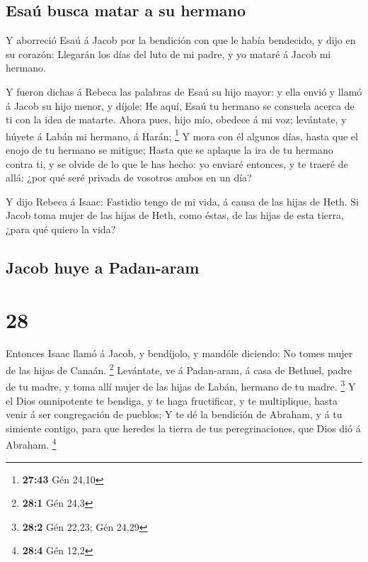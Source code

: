 \hypertarget{esauxfa-busca-matar-a-su-hermano}{%
\subsection{Esaú busca matar a su
hermano}\label{esauxfa-busca-matar-a-su-hermano}}

 Y aborreció Esaú á Jacob por la bendición con que le
había bendecido, y dijo en su corazón: Llegarán los días del luto de mi
padre, y yo mataré á Jacob mi hermano.

 Y fueron dichas á Rebeca las palabras de Esaú su hijo
mayor: y ella envió y llamó á Jacob su hijo menor, y díjole: He aquí,
Esaú tu hermano se consuela acerca de ti con la idea de matarte.
 Ahora pues, hijo mío, obedece á mi voz; levántate, y
húyete á Labán mi hermano, á Harán; \footnote{\textbf{27:43} Gén 24,10}
 Y mora con él algunos días, hasta que el enojo de tu
hermano se mitigue;  Hasta que se aplaque la ira de tu
hermano contra ti, y se olvide de lo que le has hecho: yo enviaré
entonces, y te traeré de allá: ¿por qué seré privada de vosotros ambos
en un día?

 Y dijo Rebeca á Isaac: Fastidio tengo de mi vida, á
causa de las hijas de Heth. Si Jacob toma mujer de las hijas de Heth,
como éstas, de las hijas de esta tierra, ¿para qué quiero la vida?

\hypertarget{jacob-huye-a-padan-aram}{%
\subsection{Jacob huye a Padan-aram}\label{jacob-huye-a-padan-aram}}

\hypertarget{section-27}{%
\section{28}\label{section-27}}

 Entonces Isaac llamó á Jacob, y bendíjolo, y mandóle
diciendo: No tomes mujer de las hijas de Canaán. \footnote{\textbf{28:1}
  Gén 24,3}  Levántate, ve á Padan-aram, á casa de
Bethuel, padre de tu madre, y toma allí mujer de las hijas de Labán,
hermano de tu madre. \footnote{\textbf{28:2} Gén 22,23; Gén 24,29}
 Y el Dios omnipotente te bendiga, y te haga fructificar,
y te multiplique, hasta venir á ser congregación de pueblos;
 Y te dé la bendición de Abraham, y á tu simiente contigo,
para que heredes la tierra de tus peregrinaciones, que Dios dió á
Abraham. \footnote{\textbf{28:4} Gén 12,2}

